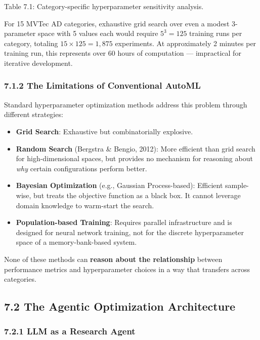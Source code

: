 \documentclass[12pt, a4paper, oneside]{report}
\begin{document}
Table 7.1: Category-specific hyperparameter sensitivity analysis.

For 15 MVTec AD categories, exhaustive grid search over even a modest 3-parameter space with 5 values each would require \(5^3 = 125\) training runs per category, totaling \(15 \times 125 = 1{,}875\) experiments. At approximately 2 minutes per training run, this represents over 60 hours of computation --- impractical for iterative development.

\subsubsection{7.1.2 The Limitations of Conventional AutoML}\label{the-limitations-of-conventional-automl}

Standard hyperparameter optimization methods address this problem through different strategies:

\begin{itemize}
\item
  \textbf{Grid Search}: Exhaustive but combinatorially explosive.
\item
  \textbf{Random Search} (Bergstra \& Bengio, 2012): More efficient than grid search for high-dimensional spaces, but provides no mechanism for reasoning about \emph{why} certain configurations perform better.
\item
  \textbf{Bayesian Optimization} (e.g., Gaussian Process-based): Efficient sample-wise, but treats the objective function as a black box. It cannot leverage domain knowledge to warm-start the search.
\item
  \textbf{Population-based Training}: Requires parallel infrastructure and is designed for neural network training, not for the discrete hyperparameter space of a memory-bank-based system.
\end{itemize}

None of these methods can \textbf{reason about the relationship} between performance metrics and hyperparameter choices in a way that transfers across categories.

\bigskip\noindent\hrulefill\bigskip

\subsection{7.2 The Agentic Optimization Architecture}\label{the-agentic-optimization-architecture}

\subsubsection{7.2.1 LLM as a Research Agent}\label{llm-as-a-research-agent}
\end{document}
